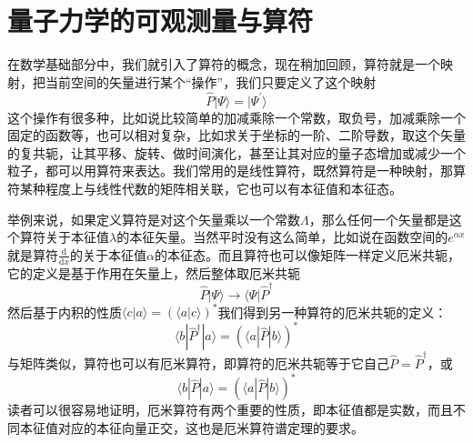 \documentclass[12pt,a4paper,openany,twoside]{book}
\numberwithin{equation}{section}
\begin{document}
  \section{量子力学的可观测量与算符}
  在数学基础部分中，我们就引入了算符的概念，现在稍加回顾，算符就是一个映射，把当前空间的矢量进行某个“操作”，我们只要定义了这个映射
  \begin{equation}
    \hat{P} | \Psi \rangle = | \Psi^{\prime} \rangle
  \end{equation}这个操作有很多种，比如说比较简单的加减乘除一个常数，取负号，加减乘除一个固定的函数等，也可以相对复杂，比如求关于坐标的一阶、二阶导数，取这个矢量的复共轭，让其平移、旋转、做时间演化，甚至让其对应的量子态增加或减少一个粒子，都可以用算符来表达。我们常用的是线性算符，既然算符是一种映射，那算符某种程度上与线性代数的矩阵相关联，它也可以有本征值和本征态。

  举例来说，如果定义算符是对这个矢量乘以一个常数$\Lambda$，那么任何一个矢量都是这个算符关于本征值$\lambda$的本征矢量。当然平时没有这么简单，比如说在函数空间的$e^{\alpha x}$就是算符$ \frac{\mathrm{d} }{\mathrm{d} x} $的关于本征值$\alpha$的本征态。而且算符也可以像矩阵一样定义厄米共轭，它的定义是基于作用在矢量上，然后整体取厄米共轭
  \begin{equation}
    \hat{P} | \Psi \rangle  \rightarrow  \langle \Psi | \hat{P}^{\dagger}
  \end{equation}
  然后基于内积的性质$\langle c | a\rangle=(\langle a | c\rangle)^{*}$我们得到另一种算符的厄米共轭的定义：
  \begin{equation}
    \langle b|\hat{P}^{\dagger}| a\rangle=(\langle a|\hat{P}| b\rangle)^{*}
    \label{adjoint}
  \end{equation}
  与矩阵类似，算符也可以有厄米算符，即算符的厄米共轭等于它自己$\hat{P}=\hat{P}^{\dagger}$，或
  \begin{equation}
    \langle b|\hat{P}| a\rangle=(\langle a|\hat{P}| b\rangle)^{*}
    \label{hermite operator}
  \end{equation}
  读者可以很容易地证明，厄米算符有两个重要的性质，即本征值都是实数，而且不同本征值对应的本征向量正交，这也是厄米算符谱定理的要求。
\end{document}

